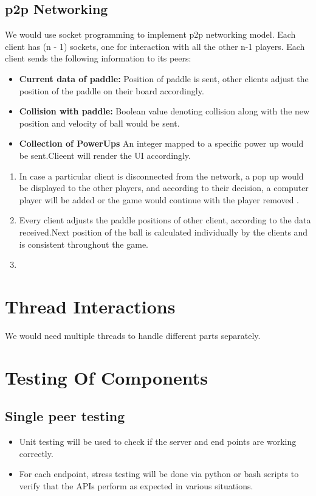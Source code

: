 \documentclass{article}
\begin{document}
			\subsection{p2p Networking}
			\par\noindent We would use socket programming to implement p2p networking model. Each client has (n - 1) sockets, one for interaction with all the other n-1 players. Each client sends the following information to its peers:
			\begin{itemize}
			\item \textbf{Current data of paddle:} Position of paddle is sent,  other clients adjust the position of the paddle on their board accordingly. 
			\item \textbf{Collision with paddle:} Boolean value denoting collision along with the new position and velocity of ball would be sent.
			\item \textbf{Collection of PowerUps} An integer mapped to a specific power up would be sent.Clieent will render the UI accordingly.
			\end{itemize}
				\begin{enumerate}
					\item In case a particular client is disconnected from the network, a pop up would be displayed to the other players, and according to their decision, a computer player will be added or the game would continue with the player removed .
					\item Every client adjusts the paddle positions of other client, according to the data received.Next position of the ball is calculated individually by the clients and is consistent throughout the game.
					\item  
				\end{enumerate}
			

	\section{Thread Interactions}
	\par\noindent We would need multiple threads to handle different parts separately.
	
	\section{Testing Of Components}
			\subsection{Single peer testing}
				\begin{itemize}
					\item Unit testing will be used to check if the server and end points are working correctly.
					\item For each endpoint, stress testing will be done via python or bash scripts to verify that the APIs perform as expected in various situations.
				\end{itemize}
\end{document}
